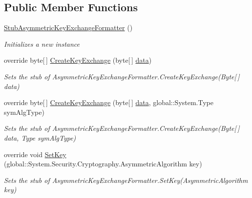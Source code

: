 \subsection*{Public Member Functions}
\begin{DoxyCompactItemize}
\item 
\hyperlink{class_system_1_1_security_1_1_cryptography_1_1_fakes_1_1_stub_asymmetric_key_exchange_formatter_a8b041c0086877c1bc79ec32532937912}{Stub\-Asymmetric\-Key\-Exchange\-Formatter} ()
\begin{DoxyCompactList}\small\item\em Initializes a new instance\end{DoxyCompactList}\item 
override byte\mbox{[}$\,$\mbox{]} \hyperlink{class_system_1_1_security_1_1_cryptography_1_1_fakes_1_1_stub_asymmetric_key_exchange_formatter_a4305fd31c5016294862e911d0c862dc8}{Create\-Key\-Exchange} (byte\mbox{[}$\,$\mbox{]} \hyperlink{jquery-1_810_82-vsdoc_8js_a609407b3456fdc3c5671a9fc4a226ff7}{data})
\begin{DoxyCompactList}\small\item\em Sets the stub of Asymmetric\-Key\-Exchange\-Formatter.\-Create\-Key\-Exchange(\-Byte\mbox{[}$\,$\mbox{]} data)\end{DoxyCompactList}\item 
override byte\mbox{[}$\,$\mbox{]} \hyperlink{class_system_1_1_security_1_1_cryptography_1_1_fakes_1_1_stub_asymmetric_key_exchange_formatter_aae2dabbd38f6c68df2315c022c102130}{Create\-Key\-Exchange} (byte\mbox{[}$\,$\mbox{]} \hyperlink{jquery-1_810_82-vsdoc_8js_a609407b3456fdc3c5671a9fc4a226ff7}{data}, global\-::\-System.\-Type sym\-Alg\-Type)
\begin{DoxyCompactList}\small\item\em Sets the stub of Asymmetric\-Key\-Exchange\-Formatter.\-Create\-Key\-Exchange(\-Byte\mbox{[}$\,$\mbox{]} data, Type sym\-Alg\-Type)\end{DoxyCompactList}\item 
override void \hyperlink{class_system_1_1_security_1_1_cryptography_1_1_fakes_1_1_stub_asymmetric_key_exchange_formatter_a1a853505917430031fa7ea8a26fbaadc}{Set\-Key} (global\-::\-System.\-Security.\-Cryptography.\-Asymmetric\-Algorithm key)
\begin{DoxyCompactList}\small\item\em Sets the stub of Asymmetric\-Key\-Exchange\-Formatter.\-Set\-Key(\-Asymmetric\-Algorithm key)\end{DoxyCompactList}\end{DoxyCompactItemize}
